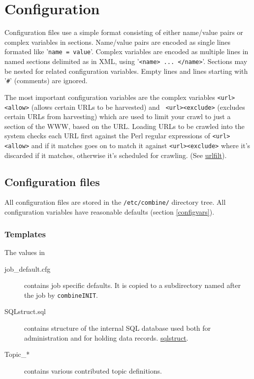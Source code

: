 \section{Configuration}
\label{configuration}
Configuration files use a simple format consisting of either name/value pairs
or complex variables in sections. Name/value pairs are encoded as single lines 
formated like '{\tt name~=~value}'. Complex variables are encoded as multiple
lines in named sections delimited as in XML, using '{\tt <name> ... </name>}'.
Sections may be nested for related configuration variables.
Empty lines and lines starting with '{\tt \#}' (comments) are ignored.


The most important configuration variables are the complex variables
{\tt <url><allow>} (allows certain URLs to be harvested) and {\tt
<url><exclude>} (excludes certain URLs from harvesting) which are used
to limit your crawl to just a section of the WWW, based on the URL.
Loading URLs to be crawled into the system checks each URL first
against the Perl regular expressions of {\tt <url><allow>} and if it
matches goes on to match it against {\tt <url><exclude>} where it's
discarded if it matches, otherwise it's scheduled for crawling.
(See \hyperref{'URL filtering'}{section }{ 'URL filtering'}{urlfilt}).

\subsection{Configuration files}
All configuration files are stored in the {\tt /etc/combine/}
directory tree. All configuration variables have reasonable defaults (section \ref{configvars}).

\subsubsection{Templates}
The values in
\begin{description}
\item[job\_default.cfg] contains job specific defaults. It is copied to a
subdirectory named after the job by {\tt combineINIT}.

\item[SQLstruct.sql]
contains structure of the internal SQL database used both for administration
and for holding data records. \hyperref{Details}{Details in section }{}{sqlstruct}.

\item[Topic\_*] contains various contributed topic definitions.
\end{description}

